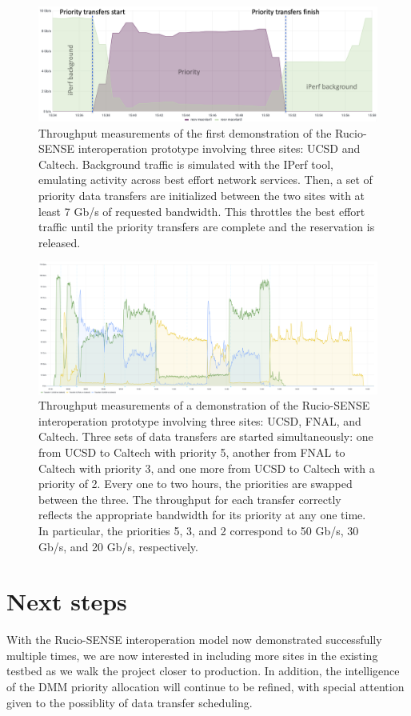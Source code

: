 \begin{figure}[htb]
    \centering
    \includegraphics[width=.9\textwidth]{fig/cyber/rucio-sense_demo.png}
    \caption[Rucio-SENSE interoperation throughput with 2 sites in the testbed]{
        Throughput measurements of the first demonstration of the Rucio-SENSE interoperation prototype involving three sites: UCSD and Caltech. 
        Background traffic is simulated with the IPerf tool, emulating activity across best effort network services. 
        Then, a set of priority data transfers are initialized between the two sites with at least 7 Gb/s of requested bandwidth. 
        This throttles the best effort traffic until the priority transfers are complete and the reservation is released. 
    }
    \label{fig:rucio_sense_demo}
\end{figure}

\begin{figure}[htb]
    \centering
    \includegraphics[width=.9\textwidth]{fig/cyber/rucio-sense_demo_big.png}
    \caption[Rucio-SENSE interoperation throughput with 3 sites in the testbed]{
        Throughput measurements of a demonstration of the Rucio-SENSE interoperation prototype involving three sites: UCSD, FNAL, and Caltech. 
        Three sets of data transfers are started simultaneously: one from UCSD to Caltech with priority 5, another from FNAL to Caltech with priority 3, and one more from UCSD to Caltech with a priority of 2. 
        Every one to two hours, the priorities are swapped between the three. 
        The throughput for each transfer correctly reflects the appropriate bandwidth for its priority at any one time. 
        In particular, the priorities 5, 3, and 2 correspond to 50 Gb/s, 30 Gb/s, and 20 Gb/s, respectively.
      }
    \label{fig:rucio_sense_demo_big}
\end{figure}

\section{Next steps}
With the Rucio-SENSE interoperation model now demonstrated successfully multiple times, we are now interested in including more sites in the existing testbed as we walk the project closer to production. 
In addition, the intelligence of the DMM priority allocation will continue to be refined, with special attention given to the possiblity of data transfer scheduling. 
